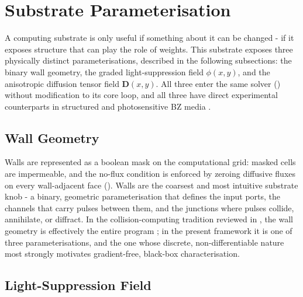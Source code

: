 \section{Substrate Parameterisation}
\label{sec:meth_parameterisation}

A computing substrate is only useful if something about it can be changed - if it exposes structure that can play the role of weights. 
This substrate exposes three physically distinct parameterisations, described in the following subsections: the binary wall geometry, the graded light-suppression field $\phi(x,y)$, and the anisotropic diffusion tensor field $\mathbf{D}(x,y)$. 
All three enter the same solver () without modification to its core loop, and all three have direct experimental counterparts in structured and photosensitive BZ media \cite{sakurai2002design, steinbock1995anisotropy}.

\subsection{Wall Geometry}
\label{sec:meth_walls}

Walls are represented as a boolean mask on the computational grid: masked cells are impermeable, and the no-flux condition is enforced by zeroing diffusive fluxes on every wall-adjacent face (). 
Walls are the coarsest and most intuitive substrate knob - a binary, geometric parameterisation that defines the input ports, the channels that carry pulses between them, and the junctions where pulses collide, annihilate, or diffract. 
In the collision-computing tradition reviewed in , the wall geometry is effectively the entire program \cite{toth1995logic, adamatzky2002xor}; in the present framework it is one of three parameterisations, and the one whose discrete, non-differentiable nature most strongly motivates gradient-free, black-box characterisation.

\subsection{Light-Suppression Field}
\label{sec:meth_light}

